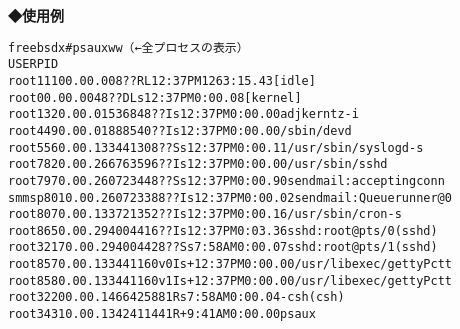 \noindent
{\bf ◆使用例}
\begin{center}
\begin{breakbox}
\begin{alltt}
freebsdx# ps auxww （←全プロセスの表示）
USER    PID %CPU %MEM   VSZ   RSS  TT  STAT STARTED      TIME COMMAND
root     11 100.0  0.0     0     8  ??  RL   12:37PM 1263:15.43 [idle]
root      0  0.0  0.0     0    48  ??  DLs  12:37PM   0:00.08 [kernel]
root    132  0.0  0.0  1536   848  ??  Is   12:37PM   0:00.00 adjkerntz -i
root    449  0.0  0.0  1888   540  ??  Is   12:37PM   0:00.00 /sbin/devd
root    556  0.0  0.1  3344  1308  ??  Ss   12:37PM   0:00.11 /usr/sbin/syslogd -s
root    782  0.0  0.2  6676  3596  ??  Is   12:37PM   0:00.00 /usr/sbin/sshd
root    797  0.0  0.2  6072  3448  ??  Ss   12:37PM   0:00.90 sendmail: accepting conn
smmsp   801  0.0  0.2  6072  3388  ??  Is   12:37PM   0:00.02 sendmail: Queue runner@0
root    807  0.0  0.1  3372  1352  ??  Is   12:37PM   0:00.16 /usr/sbin/cron -s
root    865  0.0  0.2  9400  4416  ??  Is   12:37PM   0:03.36 sshd: root@pts/0 (sshd)
root   3217  0.0  0.2  9400  4428  ??  Ss    7:58AM   0:00.07 sshd: root@pts/1 (sshd)
root    857  0.0  0.1  3344  1160  v0  Is+  12:37PM   0:00.00 /usr/libexec/getty Pc tt
root    858  0.0  0.1  3344  1160  v1  Is+  12:37PM   0:00.00 /usr/libexec/getty Pc tt
root   3220  0.0  0.1  4664  2588   1  Rs    7:58AM   0:00.04 -csh (csh)
root   3431  0.0  0.1  3424  1144   1  R+    9:41AM   0:00.00 ps aux
\end{alltt}
\end{breakbox}
\end{center}
\clearpage
